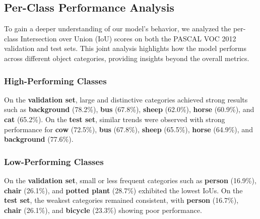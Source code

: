 \subsection{Per-Class Performance Analysis}
\label{subsec:per_class_performance_analysis}

To gain a deeper understanding of our model's behavior, we analyzed the per-class Intersection over Union (IoU) scores on both the PASCAL VOC 2012 validation and test sets. This joint analysis highlights how the model performs across different object categories, providing insights beyond the overall metrics.

\subsubsection{High-Performing Classes}

On the \textbf{validation set}, large and distinctive categories achieved strong results such as \textbf{background} (78.2\%), \textbf{bus} (67.8\%), \textbf{sheep} (62.0\%), \textbf{horse} (60.9\%), and \textbf{cat} (65.2\%).  
On the \textbf{test set}, similar trends were observed with strong performance for \textbf{cow} (72.5\%), \textbf{bus} (67.8\%), \textbf{sheep} (65.5\%), \textbf{horse} (64.9\%), and \textbf{background} (77.6\%).

\subsubsection{Low-Performing Classes}

On the \textbf{validation set}, small or less frequent categories such as \textbf{person} (16.9\%), \textbf{chair} (26.1\%), and \textbf{potted plant} (28.7\%) exhibited the lowest IoUs.  
On the \textbf{test set}, the weakest categories remained consistent, with \textbf{person} (16.7\%), \textbf{chair} (26.1\%), and \textbf{bicycle} (23.3\%) showing poor performance.



